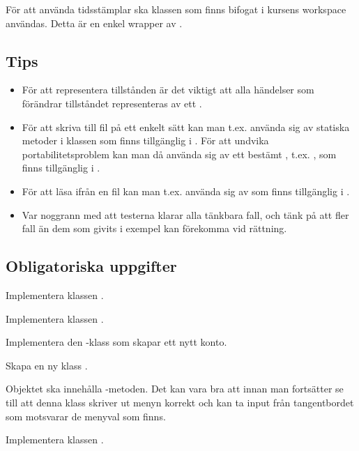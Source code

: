För att använda tidsstämplar ska klassen  som finns bifogat i kursens workspace användas. Detta är en enkel wrapper av .


\subsection{Tips}

\begin{itemize}
\item För att representera tillstånden är det viktigt att alla händelser som förändrar tillståndet representeras av ett .

\item För att skriva till fil på ett enkelt sätt kan man t.ex. använda sig av statiska metoder i klassen  som finns tillgänglig i . För att undvika portabilitetsproblem kan man då använda sig av ett bestämt , t.ex. , som finns tillgänglig i \newline{}.

\item För att läsa ifrån en fil kan man t.ex. använda sig av  som finns tillgänglig i .

\item Var noggrann med att testerna klarar alla tänkbara fall, och tänk på att fler fall än dem som givits i exempel kan förekomma vid rättning.
\end{itemize}

\subsection{Obligatoriska uppgifter}

\Task Implementera klassen .

\Task Implementera klassen .

\Task Implementera den -klass som skapar ett nytt konto.

\Task Skapa en ny klass .

\Subtask Objektet  ska innehålla -metoden. Det kan vara bra att innan man fortsätter se till att denna klass skriver ut menyn korrekt och kan ta input från tangentbordet som motsvarar de menyval som finns.

\Task Implementera klassen .

